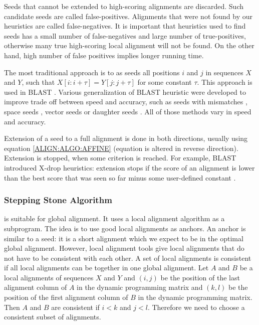 Seeds that cannot be extended to high-scoring alignments are
discarded. Such candidate seeds are called false-positives.
Alignments that were not found by our heuristics
are called false-negatives.
It is important that heuristics used to find seeds has a small number of
false-negatives and large number of true-positives,
otherwise many true high-scoring local alignment will not be found. On the other
hand, high number of false positives implies longer running time. 


The most traditional approach is to as seeds all positions $i$ and $j$ in
sequences $X$ and $Y$, such that $X[i:i+\tau]=Y[j:j+\tau]$ for some constant
$\tau$. This approach is used in BLAST \cite{Altschul1990}.  Various
generalization of BLAST heuristic were developed to improve trade off between
speed and accuracy, such as seeds with mismatches \cite{Kent2002}, space seeds
\cite{Ma2002}, vector seeds \cite{Brejova2005vector} or daughter seeds
\cite{Csuros2005}. All of those methods vary in speed and accuracy.

Extension of a seed to a full alignment is done in both directions, usually
using equation \ref{ALIGN:ALGO:AFFINE} (equation is altered in reverse
direction). Extension is stopped, when some criterion is reached. For example,
BLAST introduced X-drop heuristics: extension stops if the score of an alignment
is lower than the best score that was seen so far minus some user-defined
constant \cite{Altschul1997}.

\subsubsection{Stepping Stone Algorithm}
\label{SECTION:SSA}

\cite{Meyer2002,Pairagon2009} is suitable for global alignment. It uses
a local alignment algorithm as a subprogram. The idea is to use good local
alignments as anchors. An anchor is similar to a seed: it is a short alignment which we
expect to be in the optimal global alignment.  However, local alignment tools
give local alignments that do not have to be consistent with each other. A set of
local alignments is consistent if all local alignments can be together in one
global alignment. Let $A$ and $B$ be a local alignments of sequences $X$ and
$Y$ and $(i,j)$ be the position of the last alignment column of $A$ in the dynamic
programming matrix and $(k,l)$ be the position of the first alignment column of
$B$ in the dynamic programming matrix. Then $A$ and $B$ are consistent if $i<k$
and $j<l$.
Therefore we need to choose a consistent subset of alignments.

